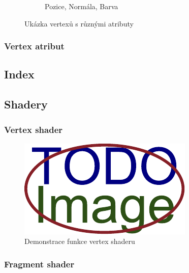 \begin{figure}[H]
\begin{subfigure}{0.32\textwidth}
		\caption{Pozice, Normála, Barva}
		\label{fig:opengl:vertex:pnb}
	\end{subfigure}
	\caption{Ukázka vertexů s různými atributy}
	\label{fig:opengl:vertex}
\end{figure}


\subsubsection*{Vertex atribut}\label{ch:teorie:opengl:vertex:attr}

\subsection{Index}\label{ch:teorie:opengl:index}

\subsection{Shadery}\label{ch:teorie:opengl:shadery}

\subsubsection*{Vertex shader}\label{ch:teorie:opengl:vertex-shader}

\begin{figure}[H]
	\centering
	\includegraphics[width=.5\linewidth]{obrazky-figures/placeholder.pdf}
	\caption{Demonstrace funkce vertex shaderu}
	\label{fig:opengl:vertex-shader}
\end{figure}

\subsubsection*{Fragment shader}\label{ch:teorie:opengl:fragment-shader}

